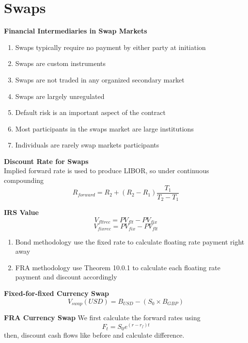 \documentclass[11pt,fleqn]{report} %
\numberwithin{equation}{section} %
\numberwithin{figure}{section} %
\numberwithin{table}{section} %
\begin{document}
\chapter{Swaps}
\begin{definition}\textbf{Financial Intermediaries in Swap Markets}
\begin{enumerate}
    \item Swaps typically require no payment by either party at initiation
    \item Swaps are custom instruments
    \item Swaps are not traded in any organized secondary market
    \item Swaps are largely unregulated
    \item Default risk is an important aspect of the contract
    \item Most participants in the swaps market are large institutions
    \item Individuals are rarely swap markets participants
\end{enumerate}
\end{definition}
\begin{theorem}\textbf{Discount Rate for Swaps}\\
Implied forward rate is used to produce LIBOR, so under continuous compounding
$$
R_{forward}=R_2+(R_2-R_1)\frac{T_1}{T_2-T_1}
$$
\end{theorem}
\begin{theorem}\textbf{IRS Value}
$$
V_{fltrec}=PV_{flt}-PV_{fix}
$$
$$
V_{fixrec}=PV_{fix}-PV_{flt}
$$
\end{theorem}
\begin{remark}
\begin{enumerate}
    \item Bond methodology use the fixed rate to calculate floating rate payment right away
    \item FRA methodology use Theorem 10.0.1 to calculate each floating rate payment and discount accordingly
\end{enumerate}
\end{remark}
\begin{theorem}\textbf{Fixed-for-fixed Currency Swap}
$$
V_{swap}(USD)=B_{USD}-(S_0\times B_{GBP})
$$
\end{theorem}
\begin{theorem}\textbf{FRA Currency Swap}
We first calculate the forward rates using
$$
F_t=S_0e^{(r-r_f)t}
$$
then, discount cash flows like before and calculate difference.
\end{theorem}
\end{document}
